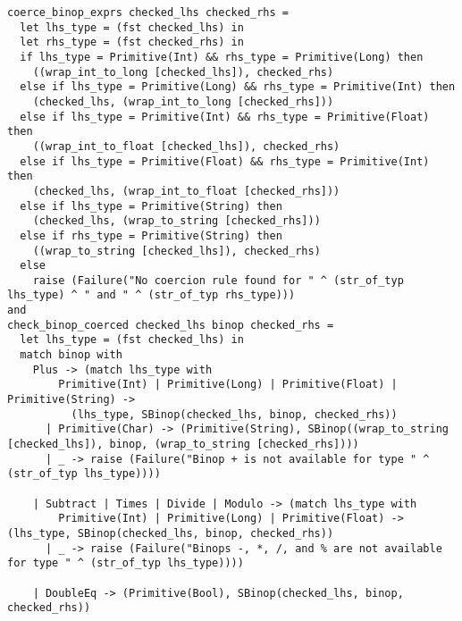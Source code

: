 \documentclass{article}
\begin{document}
\begin{verbatim}
coerce_binop_exprs checked_lhs checked_rhs =
  let lhs_type = (fst checked_lhs) in
  let rhs_type = (fst checked_rhs) in
  if lhs_type = Primitive(Int) && rhs_type = Primitive(Long) then
    ((wrap_int_to_long [checked_lhs]), checked_rhs)
  else if lhs_type = Primitive(Long) && rhs_type = Primitive(Int) then
    (checked_lhs, (wrap_int_to_long [checked_rhs]))
  else if lhs_type = Primitive(Int) && rhs_type = Primitive(Float) then
    ((wrap_int_to_float [checked_lhs]), checked_rhs)
  else if lhs_type = Primitive(Float) && rhs_type = Primitive(Int) then
    (checked_lhs, (wrap_int_to_float [checked_rhs]))
  else if lhs_type = Primitive(String) then
    (checked_lhs, (wrap_to_string [checked_rhs]))
  else if rhs_type = Primitive(String) then
    ((wrap_to_string [checked_lhs]), checked_rhs)
  else
    raise (Failure("No coercion rule found for " ^ (str_of_typ lhs_type) ^ " and " ^ (str_of_typ rhs_type)))
and
check_binop_coerced checked_lhs binop checked_rhs =
  let lhs_type = (fst checked_lhs) in
  match binop with
    Plus -> (match lhs_type with
        Primitive(Int) | Primitive(Long) | Primitive(Float) | Primitive(String) ->
          (lhs_type, SBinop(checked_lhs, binop, checked_rhs))
      | Primitive(Char) -> (Primitive(String), SBinop((wrap_to_string [checked_lhs]), binop, (wrap_to_string [checked_rhs])))
      | _ -> raise (Failure("Binop + is not available for type " ^ (str_of_typ lhs_type))))

    | Subtract | Times | Divide | Modulo -> (match lhs_type with
        Primitive(Int) | Primitive(Long) | Primitive(Float) -> (lhs_type, SBinop(checked_lhs, binop, checked_rhs))
      | _ -> raise (Failure("Binops -, *, /, and % are not available for type " ^ (str_of_typ lhs_type))))

    | DoubleEq -> (Primitive(Bool), SBinop(checked_lhs, binop, checked_rhs))


\end{verbatim}
\end{document}
